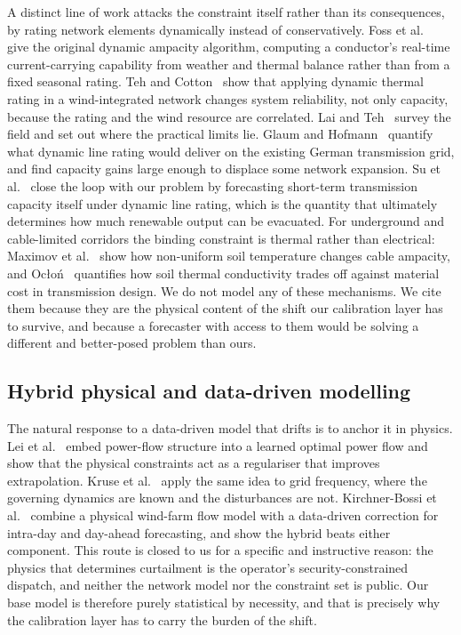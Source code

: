 \documentclass[preprint,3p,times]{elsarticle}
\begin{document}
A distinct line of work attacks the constraint itself rather than its consequences, by rating network elements dynamically instead of conservatively. Foss et al.~\cite{foss1983} give the original dynamic ampacity algorithm, computing a conductor's real-time current-carrying capability from weather and thermal balance rather than from a fixed seasonal rating. Teh and Cotton~\cite{teh2016} show that applying dynamic thermal rating in a wind-integrated network changes system reliability, not only capacity, because the rating and the wind resource are correlated. Lai and Teh~\cite{lai2022} survey the field and set out where the practical limits lie. Glaum and Hofmann~\cite{glaum2023} quantify what dynamic line rating would deliver on the existing German transmission grid, and find capacity gains large enough to displace some network expansion. Su et al.~\cite{su2025} close the loop with our problem by forecasting short-term transmission capacity itself under dynamic line rating, which is the quantity that ultimately determines how much renewable output can be evacuated. For underground and cable-limited corridors the binding constraint is thermal rather than electrical: Maximov et al.~\cite{maximov2016} show how non-uniform soil temperature changes cable ampacity, and Ocło\'n~\cite{oclon2021} quantifies how soil thermal conductivity trades off against material cost in transmission design. We do not model any of these mechanisms. We cite them because they are the physical content of the shift our calibration layer has to survive, and because a forecaster with access to them would be solving a different and better-posed problem than ours.

\subsection{Hybrid physical and data-driven modelling}

The natural response to a data-driven model that drifts is to anchor it in physics. Lei et al.~\cite{lei2021} embed power-flow structure into a learned optimal power flow and show that the physical constraints act as a regulariser that improves extrapolation. Kruse et al.~\cite{kruse2023} apply the same idea to grid frequency, where the governing dynamics are known and the disturbances are not. Kirchner-Bossi et al.~\cite{kirchnerbossi2024} combine a physical wind-farm flow model with a data-driven correction for intra-day and day-ahead forecasting, and show the hybrid beats either component. This route is closed to us for a specific and instructive reason: the physics that determines curtailment is the operator's security-constrained dispatch, and neither the network model nor the constraint set is public. Our base model is therefore purely statistical by necessity, and that is precisely why the calibration layer has to carry the burden of the shift.
\end{document}
